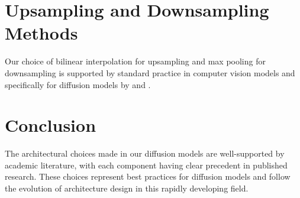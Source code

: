 \documentclass{article}
\begin{document}
\section{Upsampling and Downsampling Methods}

Our choice of bilinear interpolation for upsampling and max pooling for downsampling is supported by standard practice in computer vision models and specifically for diffusion models by \citet{ho2020denoising} and \citet{dhariwal2021diffusion}.

\section{Conclusion}

The architectural choices made in our diffusion models are well-supported by academic literature, with each component having clear precedent in published research. These choices represent best practices for diffusion models and follow the evolution of architecture design in this rapidly developing field.


\end{document}
